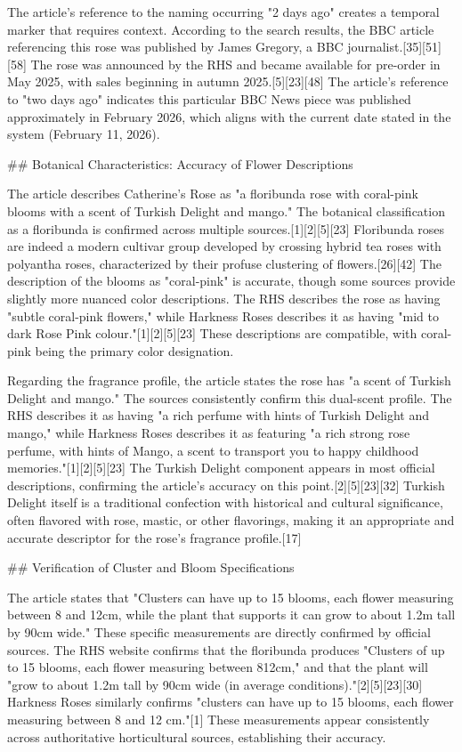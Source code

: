 \documentclass[10pt,a4paper]{article}
\begin{document}
\par\medskip
The article's reference to the naming occurring "2 days ago" creates a temporal marker that requires context. According to the search results, the BBC article referencing this rose was published by James Gregory, a BBC journalist.[35][51][58] The rose was announced by the RHS and became available for pre-order in May 2025, with sales beginning in autumn 2025.[5][23][48] The article's reference to "two days ago" indicates this particular BBC News piece was published approximately in February 2026, which aligns with the current date stated in the system (February 11, 2026).
\par\medskip
\#\# Botanical Characteristics: Accuracy of Flower Descriptions
\par\medskip
The article describes Catherine's Rose as "a floribunda rose with coral-pink blooms with a scent of Turkish Delight and mango." The botanical classification as a floribunda is confirmed across multiple sources.[1][2][5][23] Floribunda roses are indeed a modern cultivar group developed by crossing hybrid tea roses with polyantha roses, characterized by their profuse clustering of flowers.[26][42] The description of the blooms as "coral-pink" is accurate, though some sources provide slightly more nuanced color descriptions. The RHS describes the rose as having "subtle coral-pink flowers," while Harkness Roses describes it as having "mid to dark Rose Pink colour."[1][2][5][23] These descriptions are compatible, with coral-pink being the primary color designation.
\par\medskip
Regarding the fragrance profile, the article states the rose has "a scent of Turkish Delight and mango." The sources consistently confirm this dual-scent profile. The RHS describes it as having "a rich perfume with hints of Turkish Delight and mango," while Harkness Roses describes it as featuring "a rich strong rose perfume, with hints of Mango, a scent to transport you to happy childhood memories."[1][2][5][23] The Turkish Delight component appears in most official descriptions, confirming the article's accuracy on this point.[2][5][23][32] Turkish Delight itself is a traditional confection with historical and cultural significance, often flavored with rose, mastic, or other flavorings, making it an appropriate and accurate descriptor for the rose's fragrance profile.[17]
\par\medskip
\#\# Verification of Cluster and Bloom Specifications
\par\medskip
The article states that "Clusters can have up to 15 blooms, each flower measuring between 8 and 12cm, while the plant that supports it can grow to about 1.2m tall by 90cm wide." These specific measurements are directly confirmed by official sources. The RHS website confirms that the floribunda produces "Clusters of up to 15 blooms, each flower measuring between 812cm," and that the plant will "grow to about 1.2m tall by 90cm wide (in average conditions)."[2][5][23][30] Harkness Roses similarly confirms "clusters can have up to 15 blooms, each flower measuring between 8 and 12 cm."[1] These measurements appear consistently across authoritative horticultural sources, establishing their accuracy.
\end{document}
